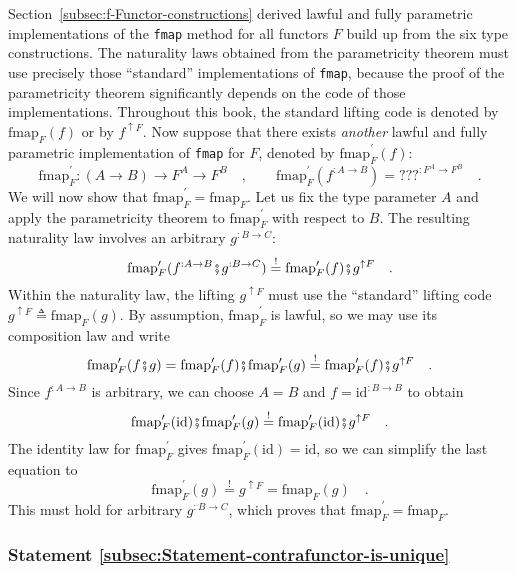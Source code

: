 Section~\ref{subsec:f-Functor-constructions} derived lawful and
fully parametric implementations of the \lstinline!fmap! method for
all functors $F$ build up from the six type constructions. The naturality
laws obtained from the parametricity theorem must use precisely those
\textsf{``}standard\textsf{''} implementations of \lstinline!fmap!, because the proof
of the parametricity theorem significantly depends on the code of
those implementations. Throughout this book, the standard lifting
code is denoted by $\text{fmap}_{F}(f)$ or by $f^{\uparrow F}$.
Now suppose that there exists \emph{another} lawful and fully parametric
implementation of \lstinline!fmap! for $F$, denoted by $\text{fmap}_{F}^{\prime}(f)$:
\[
\text{fmap}_{F}^{\prime}:\left(A\rightarrow B\right)\rightarrow F^{A}\rightarrow F^{B}\quad,\quad\quad\text{fmap}_{F}^{\prime}(f^{:A\rightarrow B})=\text{???}^{:F^{A}\rightarrow F^{B}}\quad.
\]
We will now show that $\text{fmap}_{F}^{\prime}=\text{fmap}_{F}$.
Let us fix the type parameter $A$ and apply the parametricity theorem
to $\text{fmap}_{F}^{\prime}$ with respect to $B$. The resulting
naturality law involves an arbitrary $g^{:B\rightarrow C}$:
\[
\text{fmap}_{F}^{\prime}(f^{:A\rightarrow B}\bef g^{:B\rightarrow C})\overset{!}{=}\text{fmap}_{F}^{\prime}(f)\bef g^{\uparrow F}\quad.
\]
Within the naturality law, the lifting $g^{\uparrow F}$ must use
the \textsf{``}standard\textsf{''} lifting code $g^{\uparrow F}\triangleq\text{fmap}_{F}(g)$.
By assumption, $\text{fmap}_{F}^{\prime}$ is lawful, so we may use
its composition law and write
\[
\text{fmap}_{F}^{\prime}(f\bef g)=\text{fmap}_{F}^{\prime}(f)\bef\text{fmap}_{F}^{\prime}(g)\overset{!}{=}\text{fmap}_{F}^{\prime}(f)\bef g^{\uparrow F}\quad.
\]
Since $f^{:A\rightarrow B}$ is arbitrary, we can choose $A=B$ and
$f=\text{id}^{:B\rightarrow B}$ to obtain
\[
\text{fmap}_{F}^{\prime}(\text{id})\bef\text{fmap}_{F}^{\prime}(g)\overset{!}{=}\text{fmap}_{F}^{\prime}(\text{id})\bef g^{\uparrow F}\quad.
\]
The identity law for $\text{fmap}_{F}^{\prime}$ gives $\text{fmap}_{F}^{\prime}(\text{id})=\text{id}$,
so we can simplify the last equation to
\[
\text{fmap}_{F}^{\prime}(g)\overset{!}{=}g^{\uparrow F}=\text{fmap}_{F}(g)\quad.
\]
This must hold for arbitrary $g^{:B\rightarrow C}$, which proves
that $\text{fmap}_{F}^{\prime}=\text{fmap}_{F}$.

\subsubsection{Statement \label{subsec:Statement-contrafunctor-is-unique}\ref{subsec:Statement-contrafunctor-is-unique}}

